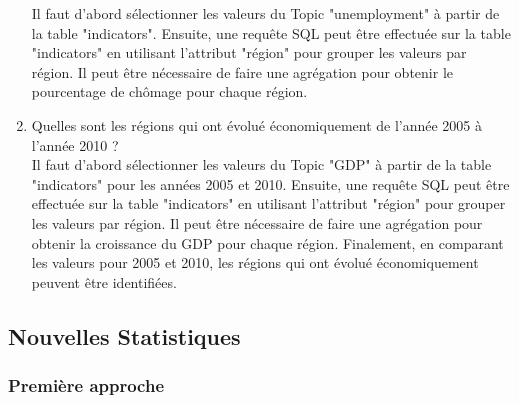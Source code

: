 \begin{enumerate}
Il faut d'abord sélectionner les valeurs du Topic "unemployment" à partir de la table "indicators".
Ensuite, une requête SQL peut être effectuée sur la table "indicators" en utilisant l'attribut "région" pour grouper les valeurs par région.
Il peut être nécessaire de faire une agrégation pour obtenir le pourcentage de chômage pour chaque région.
\item Quelles sont les régions qui ont évolué économiquement de l’année 2005 à l’année 2010 ?\\
Il faut d'abord sélectionner les valeurs du Topic "GDP" à partir de la table "indicators" pour les années 2005 et 2010.
Ensuite, une requête SQL peut être effectuée sur la table "indicators" en utilisant l'attribut "région" pour grouper les valeurs par région.
Il peut être nécessaire de faire une agrégation pour obtenir la croissance du GDP pour chaque région.
Finalement, en comparant les valeurs pour 2005 et 2010, les régions qui ont évolué économiquement peuvent être identifiées.
\end{enumerate}


\subsection{Nouvelles Statistiques}
\subsubsection{Première approche}

